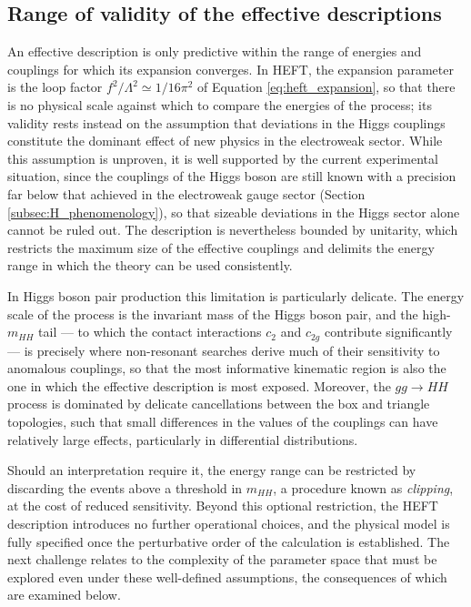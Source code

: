 \subsection{Range of validity of the effective descriptions}
\label{subsec:EFT_validity}
%
An effective description is only predictive within the range of energies and couplings for which its expansion converges. In HEFT, the expansion parameter is the loop factor $f^2/\Lambda^2\simeq1/16\pi^2$ of Equation \ref{eq:heft_expansion}, so that there is no physical scale against which to compare the energies of the process; its validity rests instead on the assumption that deviations in the Higgs couplings constitute the dominant effect of new physics in the electroweak sector. While this assumption is unproven, it is well supported by the current experimental situation, since the couplings of the Higgs boson are still known with a precision far below that achieved in the electroweak gauge sector (Section \ref{subsec:H_phenomenology}), so that sizeable deviations in the Higgs sector alone cannot be ruled out. The description is nevertheless bounded by unitarity, which restricts the maximum size of the effective couplings and delimits the energy range in which the theory can be used consistently.

In Higgs boson pair production this limitation is particularly delicate. The energy scale of the process is the invariant mass of the Higgs boson pair, and the high-$m_{HH}$ tail — to which the contact interactions $c_2$ and $c_{2g}$ contribute significantly — is precisely where non-resonant searches derive much of their sensitivity to anomalous couplings, so that the most informative kinematic region is also the one in which the effective description is most exposed. Moreover, the $gg\to HH$ process is dominated by delicate cancellations between the box and triangle topologies, such that small differences in the values of the couplings can have relatively large effects, particularly in differential distributions.

Should an interpretation require it, the energy range can be restricted by discarding the events above a threshold in $m_{HH}$, a procedure known as \textit{clipping}, at the cost of reduced sensitivity. Beyond this optional restriction, the HEFT description introduces no further operational choices, and the physical model is fully specified once the perturbative order of the calculation is established. The next challenge relates to the complexity of the parameter space that must be explored even under these well-defined assumptions, the consequences of which are examined below.





